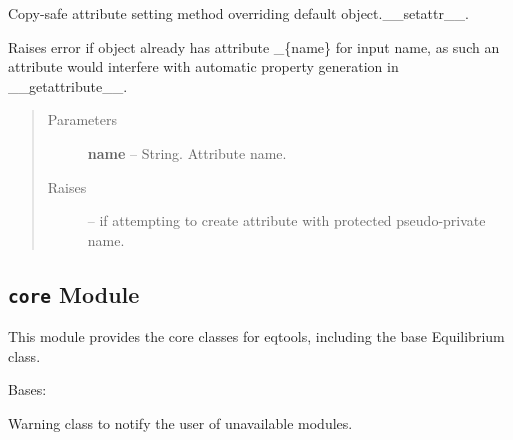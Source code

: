 \documentclass[letterpaper,10pt,english]{sphinxmanual}
\begin{document}
\begin{fulllineitems}
\begin{fulllineitems}
\begin{quote}
\begin{description}
\end{description}\end{quote}

\end{fulllineitems}


\begin{fulllineitems}
\label{eqtools:eqtools.afilereader.AFileReader.__setattr__}
Copy-safe attribute setting method overriding default object.\_\_setattr\_\_.

Raises error if object already has attribute \_\{name\} for input name,
as such an attribute would interfere with automatic property generation in
\_\_getattribute\_\_.
\begin{quote}\begin{description}
\item[{Parameters }] \leavevmode
\textbf{name} --
String.  Attribute name.

\item[{Raises }] \leavevmode
{} -- 
if attempting to create attribute with protected
pseudo-private name.

\end{description}\end{quote}

\end{fulllineitems}


\end{fulllineitems}



\subsection{\texttt{core} Module}
\label{eqtools:module-eqtools.core}\label{eqtools:core-module}
This module provides the core classes for eqtools, including the base Equilibrium class.

\begin{fulllineitems}
\label{eqtools:eqtools.core.ModuleWarning}
Bases: 

Warning class to notify the user of unavailable modules.

\end{fulllineitems}
\end{document}

